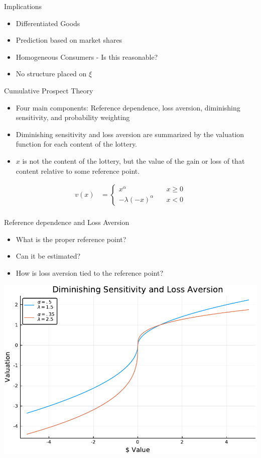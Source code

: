 \documentclass[presentation]{beamer}
\begin{document}
\begin{frame}[label={sec:orgef47506}]{Implications}
\begin{itemize}
\item Differentiated Goods
\item Prediction based on market shares
\item Homogeneous Consumers - Is this reasonable?
\item No structure placed on \(\xi\)
\end{itemize}
\end{frame}



\begin{frame}[label={sec:org80a9964}]{Cumulative Prospect Theory}
\begin{itemize}
\item Four main components: Reference dependence, loss aversion,
diminishing sensitivity, and probability weighting

\item Diminishing sensitivity and loss aversion are summarized by the
valuation function for each content of the lottery.
\item \(x\) is not the content of the lottery, but the value of the gain or
loss of that content relative to some reference point.
\end{itemize}
\begin{align*}
  v(x) &=
  \begin{cases}
    x^\alpha \quad &x \geq 0\\
    -\lambda(-x)^\alpha \quad &x < 0
  \end{cases}\\
\end{align*}
\end{frame}

\begin{frame}[label={sec:orga96a340}]{Reference dependence and Loss Aversion}
\begin{itemize}
\item What is the proper reference point?
\item Can it be estimated?
\item How is loss aversion tied to the reference point?
\end{itemize}

\begin{center}
\includegraphics[width=.75\linewidth]{../Plots/ValueFunction.pdf}
\end{center}
\end{frame}
\end{document}
